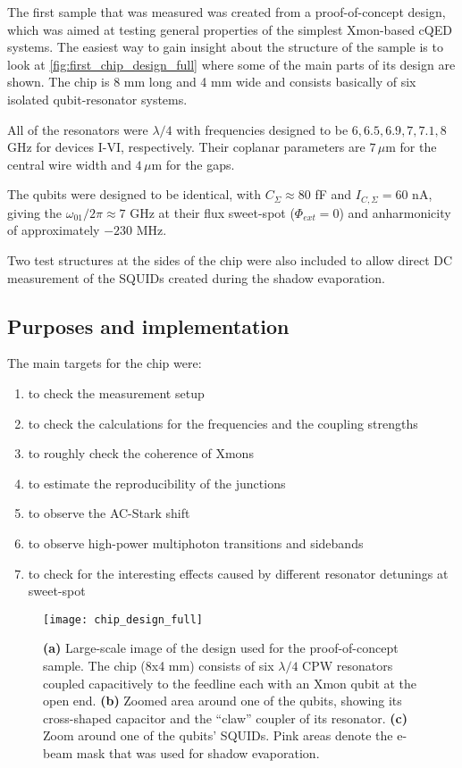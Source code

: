 \documentclass[12pt, twoside]{report}
\numberwithin{equation}{section}
\begin{document}
The first sample that was measured was created from a proof-of-concept design, which was aimed at testing general properties of the simplest Xmon-based cQED systems. The easiest way to gain insight about the structure of the sample is to look at \autoref{fig:first_chip_design_full} where some of the main parts of its design are shown. The chip is 8 mm long and 4 mm wide and consists basically of six isolated qubit-resonator systems. 

All of the resonators were $\lambda/4$ with frequencies designed to be $6, 6.5, 6.9,7,7.1,8$ GHz for devices I-VI, respectively. Their coplanar parameters are $7\,\mu$m for the central wire width and $4\,\mu$m for the gaps.

The qubits were designed to be identical, with $C_\Sigma \approx 80$ fF and $I_{C, \Sigma} = 60$ nA, giving the $\omega_{01}/2\pi \approx 7$ GHz at their flux sweet-spot ($\Phi_{ext}=0$) and anharmonicity of approximately $-230$ MHz.

Two test structures at the sides of the chip were also included to allow direct DC measurement of the SQUIDs created during the shadow evaporation.

\subsection{Purposes and implementation}

The main targets for the chip were:
\begin{enumerate}[label=(\alph*), leftmargin=1.5cm]
\itemsep0pt
 \item to check the measurement setup
 \item to check the calculations for the frequencies and the coupling strengths
 \item to roughly check the coherence of Xmons
 \item to estimate the reproducibility of the junctions 
 \item to observe the AC-Stark shift 
 \item to observe high-power multiphoton transitions and sidebands
 \item to check for the interesting effects caused by different resonator detunings at sweet-spot  
\end{enumerate}

\begin{figure}[h!]
\centering
\texttt{[image: chip\_design\_full]}
\caption{\textbf{(a)} Large-scale image of the design used for the proof-of-concept sample. The chip (8x4 mm) consists of six $\lambda/4$ CPW resonators coupled capacitively to the feedline each with an Xmon qubit at the open end. \textbf{(b)} Zoomed area around one of the qubits, showing its cross-shaped capacitor and the ``claw'' coupler of its resonator. \textbf{(c)} Zoom around one of the qubits' SQUIDs. Pink areas denote the e-beam mask that was used for shadow evaporation.}
\label{fig:first_chip_design_full}
\end{figure}
\end{document}
